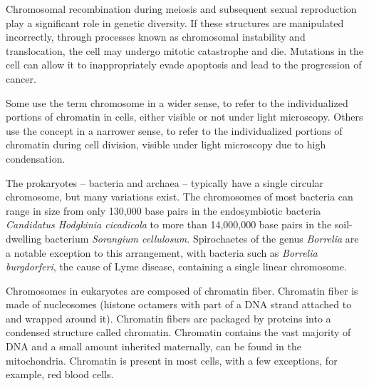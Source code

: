 \documentclass[]{book}
\begin{document}
Chromosomal recombination during meiosis and subsequent sexual reproduction play a significant role in genetic diversity. If these structures are manipulated incorrectly, through processes known as chromosomal instability and translocation, the cell may undergo mitotic catastrophe and die. Mutations in the cell can allow it to inappropriately evade apoptosis and lead to the progression of cancer.

Some use the term chromosome in a wider sense, to refer to the individualized portions of chromatin in cells, either visible or not under light microscopy. Others use the concept in a narrower sense, to refer to the individualized portions of chromatin during cell division, visible under light microscopy due to high condensation.

The prokaryotes -- bacteria and archaea -- typically have a single circular chromosome, but many variations exist. The chromosomes of most bacteria can range in size from only 130,000 base pairs in the endosymbiotic bacteria \emph{Candidatus Hodgkinia cicadicola} to more than 14,000,000 base pairs in the soil-dwelling bacterium \emph{Sorangium cellulosum}. Spirochaetes of the genus \emph{Borrelia} are a notable exception to this arrangement, with bacteria such as \emph{Borrelia burgdorferi}, the cause of Lyme disease, containing a single linear chromosome.

Chromosomes in eukaryotes are composed of chromatin fiber. Chromatin fiber is made of nucleosomes (histone octamers with part of a DNA strand attached to and wrapped around it). Chromatin fibers are packaged by proteins into a condensed structure called chromatin. Chromatin contains the vast majority of DNA and a small amount inherited maternally, can be found in the mitochondria. Chromatin is present in most cells, with a few exceptions, for example, red blood cells.
\end{document}

